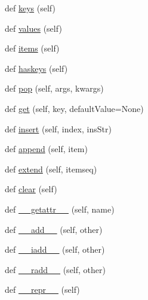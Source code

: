\begin{DoxyCompactItemize}
def \hyperlink{classsetuptools_1_1__vendor_1_1pyparsing_1_1ParseResults_afe6765f5f4372b21e973fb235bdd179c}{keys} (self)
\item 
def \hyperlink{classsetuptools_1_1__vendor_1_1pyparsing_1_1ParseResults_afdbaeb8462d5a1d91956b9e25adcff0b}{values} (self)
\item 
def \hyperlink{classsetuptools_1_1__vendor_1_1pyparsing_1_1ParseResults_a6b2179c3bd82a9570a615a71d2f90fdb}{items} (self)
\item 
def \hyperlink{classsetuptools_1_1__vendor_1_1pyparsing_1_1ParseResults_a7d86a9274eb1d10aff8898869cb39f44}{haskeys} (self)
\item 
def \hyperlink{classsetuptools_1_1__vendor_1_1pyparsing_1_1ParseResults_ae1b6359f87bc468ff9f6199c3b515a6f}{pop} (self, args, kwargs)
\item 
def \hyperlink{classsetuptools_1_1__vendor_1_1pyparsing_1_1ParseResults_a66c45d8a20af6e843c91db8054b7496f}{get} (self, key, default\+Value=None)
\item 
def \hyperlink{classsetuptools_1_1__vendor_1_1pyparsing_1_1ParseResults_abda5cb247f1cfe6441e498de830213ba}{insert} (self, index, ins\+Str)
\item 
def \hyperlink{classsetuptools_1_1__vendor_1_1pyparsing_1_1ParseResults_a3bf4e13f4fa75a900b57b26e848c35c2}{append} (self, item)
\item 
def \hyperlink{classsetuptools_1_1__vendor_1_1pyparsing_1_1ParseResults_a8963c59894060ca9d0dc2c906f8d57d9}{extend} (self, itemseq)
\item 
def \hyperlink{classsetuptools_1_1__vendor_1_1pyparsing_1_1ParseResults_a2683a26b96b087edaec172f6f837058b}{clear} (self)
\item 
def \hyperlink{classsetuptools_1_1__vendor_1_1pyparsing_1_1ParseResults_ad33d2499f059631a659b52869251366b}{\+\_\+\+\_\+getattr\+\_\+\+\_\+} (self, name)
\item 
def \hyperlink{classsetuptools_1_1__vendor_1_1pyparsing_1_1ParseResults_aae26f4724430cb8dd32b50bfdacc0b91}{\+\_\+\+\_\+add\+\_\+\+\_\+} (self, other)
\item 
def \hyperlink{classsetuptools_1_1__vendor_1_1pyparsing_1_1ParseResults_a3466087437ba83e278119b159781dfc7}{\+\_\+\+\_\+iadd\+\_\+\+\_\+} (self, other)
\item 
def \hyperlink{classsetuptools_1_1__vendor_1_1pyparsing_1_1ParseResults_a82206582a699c2dbef5fea931c5dceb8}{\+\_\+\+\_\+radd\+\_\+\+\_\+} (self, other)
\item 
def \hyperlink{classsetuptools_1_1__vendor_1_1pyparsing_1_1ParseResults_ab00da53d7690f9c0fdd443456de4feac}{\+\_\+\+\_\+repr\+\_\+\+\_\+} (self)

\end{DoxyCompactItemize}
